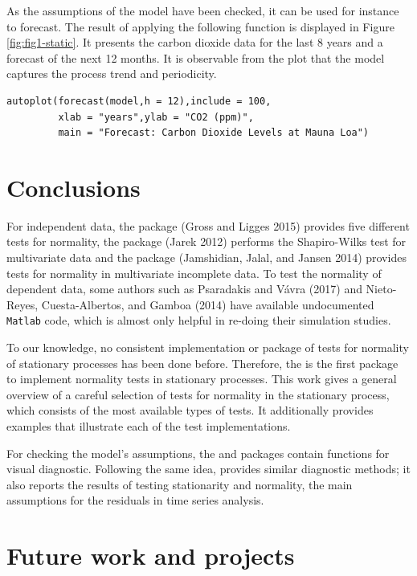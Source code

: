 As the assumptions of the model have been checked, it can be used for instance to forecast. The result of applying the following function is displayed in Figure \ref{fig:fig1-static}. It presents the carbon dioxide data for the last 8 years and a forecast of the next 12 months. It is observable from the plot that the model captures the process trend and periodicity.

\begin{verbatim}
autoplot(forecast(model,h = 12),include = 100,
         xlab = "years",ylab = "CO2 (ppm)",
         main = "Forecast: Carbon Dioxide Levels at Mauna Loa")
\end{verbatim}



\hypertarget{conclusions}{%
\section{Conclusions}\label{conclusions}}

For independent data, the  package (Gross and Ligges 2015) provides five different tests for normality, the  package (Jarek 2012) performs the Shapiro-Wilks test for multivariate data and the  package (Jamshidian, Jalal, and Jansen 2014) provides tests for normality in multivariate incomplete data. To test the normality of dependent data, some authors such as Psaradakis and Vávra (2017) and Nieto-Reyes, Cuesta-Albertos, and Gamboa (2014) have available undocumented \texttt{Matlab} code, which is almost only helpful in re-doing their simulation studies.

To our knowledge, no consistent implementation or package of tests for normality of stationary processes has been done before. Therefore, the  is the first package to implement normality tests in stationary processes. This work gives a general overview of a careful selection of tests for normality in the stationary process, which consists of the most available types of tests. It additionally provides examples that illustrate each of the test implementations.

For checking the model's assumptions, the  and  packages contain functions for visual diagnostic. Following the same idea,  provides similar diagnostic methods; it also reports the results of testing stationarity and normality, the main assumptions for the residuals in time series analysis.

\hypertarget{future-work-and-projects}{%
\section{Future work and projects}\label{future-work-and-projects}}

